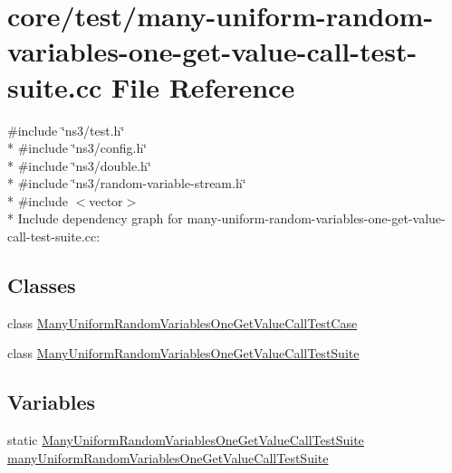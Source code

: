 \hypertarget{many-uniform-random-variables-one-get-value-call-test-suite_8cc}{}\section{core/test/many-\/uniform-\/random-\/variables-\/one-\/get-\/value-\/call-\/test-\/suite.cc File Reference}
\label{many-uniform-random-variables-one-get-value-call-test-suite_8cc}
{\ttfamily \#include \char`\"{}ns3/test.\+h\char`\"{}}\\*
{\ttfamily \#include \char`\"{}ns3/config.\+h\char`\"{}}\\*
{\ttfamily \#include \char`\"{}ns3/double.\+h\char`\"{}}\\*
{\ttfamily \#include \char`\"{}ns3/random-\/variable-\/stream.\+h\char`\"{}}\\*
{\ttfamily \#include $<$vector$>$}\\*
Include dependency graph for many-\/uniform-\/random-\/variables-\/one-\/get-\/value-\/call-\/test-\/suite.cc\+:
\subsection*{Classes}
\begin{DoxyCompactItemize}
\item 
class \hyperlink{classManyUniformRandomVariablesOneGetValueCallTestCase}{Many\+Uniform\+Random\+Variables\+One\+Get\+Value\+Call\+Test\+Case}
\item 
class \hyperlink{classManyUniformRandomVariablesOneGetValueCallTestSuite}{Many\+Uniform\+Random\+Variables\+One\+Get\+Value\+Call\+Test\+Suite}
\end{DoxyCompactItemize}
\subsection*{Variables}
\begin{DoxyCompactItemize}
\item 
static \hyperlink{classManyUniformRandomVariablesOneGetValueCallTestSuite}{Many\+Uniform\+Random\+Variables\+One\+Get\+Value\+Call\+Test\+Suite} \hyperlink{many-uniform-random-variables-one-get-value-call-test-suite_8cc_afaa9baca082c096d78787931e72217bc}{many\+Uniform\+Random\+Variables\+One\+Get\+Value\+Call\+Test\+Suite}
\end{DoxyCompactItemize}



